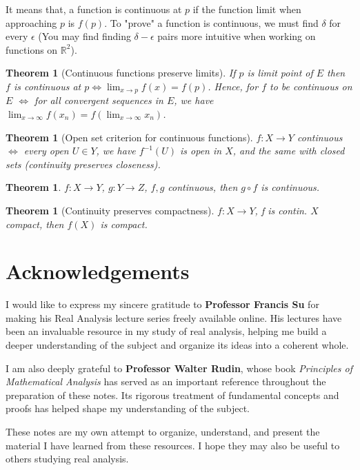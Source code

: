 \documentclass[12pt]{article}
\newcommand{\RR}{\mathbb{R}}   %
\theoremstyle{definition}
\theoremstyle{plain}
\newtheorem{theorem}[definition]{Theorem}
\begin{document}
\begin{note}
It means that, a function is continuous at $p$ if the function limit when approaching $p$ is $f(p)$. To "prove" a function is continuous, we must find $\delta$ for every $\epsilon$ (You may find finding $\delta-\epsilon$ pairs more intuitive when working on functions on $\RR^2$).
\end{note}

\begin{theorem}[Continuous functions preserve limits]
If $p$ is limit point of $E$ then $f$ is continuous at $p \iff \lim_{x\rightarrow p} f(x) = f(p)$. Hence, for $f$ to be continuous on $E$ $\iff$ for all convergent sequences in $E$, we have $\lim_{x \rightarrow \infty}f(x_n) = f(\lim_{x\rightarrow \infty}x_n)$.
\end{theorem}

\begin{theorem}[Open set criterion for continuous functions]
$f: X\rightarrow Y$ continuous $\iff$ every open $U \in Y$, we have $f^{-1}(U)$ is open in $X$, and the same with closed sets (continuity preserves closeness).
\end{theorem}

\begin{theorem}
$f: X\rightarrow Y$, $g: Y\rightarrow Z$, $f, g$ continuous, then $g \circ f$ is continuous.
\end{theorem}

\begin{theorem}[Continuity preserves compactness]
$f: X\rightarrow Y$, f is contin. $X$ compact, then $f(X)$ is compact.
\end{theorem}

\section*{Acknowledgements}

I would like to express my sincere gratitude to \textbf{Professor Francis Su}
for making his Real Analysis lecture series freely available online.
His lectures have been an invaluable resource in my study of real analysis,
helping me build a deeper understanding of the subject and organize its
ideas into a coherent whole.

I am also deeply grateful to \textbf{Professor Walter Rudin}, whose book
\textit{Principles of Mathematical Analysis} has served as an important
reference throughout the preparation of these notes. Its rigorous treatment
of fundamental concepts and proofs has helped shape my understanding of
the subject.

These notes are my own attempt to organize, understand, and present the
material I have learned from these resources. I hope they may also be
useful to others studying real analysis.
\end{document}

